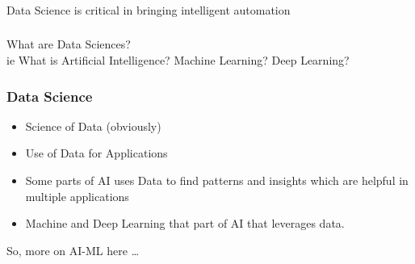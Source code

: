 


	



\begin{frame}[fragile]\frametitle{}
\begin{center}
{\Large Data Science is critical in bringing intelligent automation}
\end{center}
\end{frame}


\begin{frame}[fragile]\frametitle{}
\begin{center}
{\Large What are Data Sciences? \\ \small ie What is Artificial Intelligence? Machine Learning? Deep Learning?}
\end{center}
\end{frame}


\begin{frame}[fragile]\frametitle{Data Science}

\begin{itemize}
\item Science of Data (obviously)
\item Use of Data for Applications
\item Some parts of AI uses Data to find patterns and insights which are helpful in multiple applications
\item Machine and Deep Learning that part of AI that leverages data.
\end{itemize}

So, more on AI-ML here \ldots

\end{frame}

